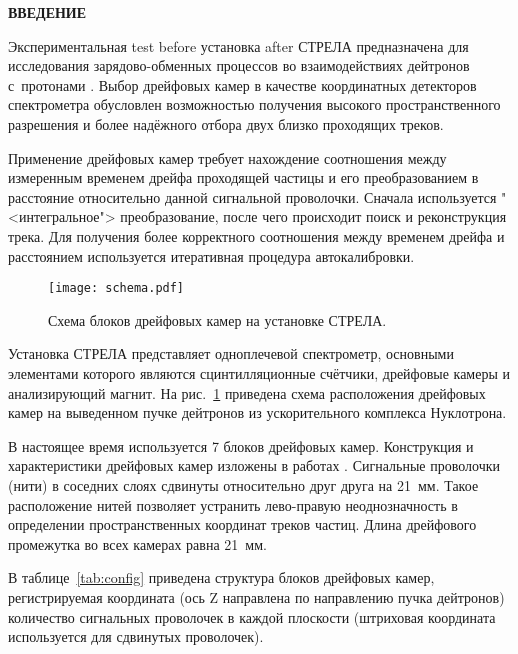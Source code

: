 
\vspace* {2.5cm}
\begin{center} \bf{ВВЕДЕНИЕ} \end{center}

Экспериментальная test before установка after СТРЕЛА предназначена для исследования
зарядово-обменных процессов во взаимодействиях дейтронов с~протонами
\cite{cejp:2008}. Выбор дрейфовых камер в качестве координатных детекторов
спектрометра обусловлен возможностью получения высокого пространственного
разрешения и более надёжного отбора двух близко проходящих треков.

Применение дрейфовых камер требует нахождение соотношения между измеренным
временем дрейфа проходящей частицы и его преобразованием в расстояние
относительно данной сигнальной проволочки. Сначала используется
"<интегральное"> преобразование, после чего происходит поиск и реконструкция
трека. Для получения более корректного соотношения между временем дрейфа
и расстоянием используется итеративная процедура автокалибровки.

\begin{figure}[h]
  \begin{center}
    \texttt{[image: schema.pdf]}
    \caption {Схема блоков дрейфовых камер на установке СТРЕЛА.}
    \label{fig:schema}
  \end{center}
\end{figure}

Установка СТРЕЛА \cite{strela:web} представляет одноплечевой спектрометр,
основными элементами которого являются сцинтилляционные счётчики, дрейфовые
камеры и анализирующий магнит. На рис.~\ref{fig:schema} приведена схема
расположения дрейфовых камер на выведенном пучке дейтронов из ускорительного
комплекса Нуклотрона.

В настоящее время используется 7 блоков дрейфовых камер. Конструкция и
характеристики дрейфовых камер изложены в работах \cite{filatova:1977,
  vodopianov:1975, vodopianov:1983}. Сигнальные проволочки (нити) в соседних
слоях сдвинуты относительно друг друга на 21~мм. Такое расположение нитей
позволяет устранить лево-правую неоднозначность в определении пространственных
координат треков частиц. Длина дрейфового промежутка во всех камерах равна
21~мм.

В таблице~\ref{tab:config} приведена структура блоков дрейфовых камер,
регистрируемая координата (ось Z направлена по направлению пучка дейтронов)
количество сигнальных проволочек в каждой плоскости (штриховая координата
используется для сдвинутых проволочек).

